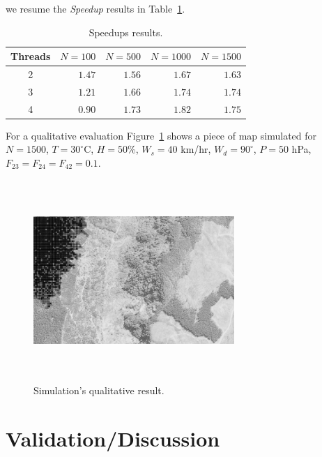 \documentclass[conference]{IEEEtran}
\begin{document}
    we resume the \emph{Speedup} results in Table~\ref{tab:speedups}.
    
    \begin{table}[!ht]
        \renewcommand{\arraystretch}{1.3}
        \centering
        \caption{Speedups results.}
        \label{tab:speedups}
        \begin{tabular}{c||rrrr}
            \hline
            Threads & $N=100$ & $N=500$ & $N=1000$ & $N=1500$ \\ \hline\hline
            2       & $1.47$ & $1.56$ & $1.67$ & $1.63$ \\
            3       & $1.21$ & $1.66$ & $1.74$ & $1.74$ \\
            4       & $0.90$ & $1.73$ & $1.82$ & $1.75$  
        \end{tabular}
    \end{table}
    
    
    For a qualitative evaluation Figure~\ref{fig:simulation} shows a piece of map simulated for 
    $N=1500$, $T=30^{\circ}$C, $H=50$\%, $W_s=40$ km/hr, $W_d=90^{\circ}$, $P=50$ hPa, 
    $F_{23} = F_{24}= F_{42} = 0.1$.
    
    \begin{figure}[!ht]
        \centering
        \includegraphics[width=3in,height=3in,clip,keepaspectratio]{figures/simulation_gray.png}
        \caption{Simulation's qualitative result.}
        \label{fig:simulation}
    \end{figure}
    

\section{Validation/Discussion}
    
\end{document}

